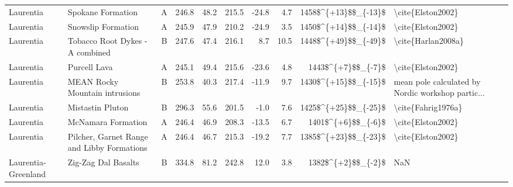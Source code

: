 \begin{longtable}{p{1 in}p{1 in}rrrrrrr}
                     Laurentia &                                  Spokane Formation &      A &     246.8 &      48.2 & 215.5 & -24.8 &       4.7 &   1458\$\textasciicircum \{+13\}\$\$\_\{-13\}\$ &                                  \textbackslash cite\{Elston2002\} \\
                     Laurentia &                                 Snowslip Formation &      A &     245.9 &      47.9 & 210.2 & -24.9 &       3.5 &   1450\$\textasciicircum \{+14\}\$\$\_\{-14\}\$ &                                  \textbackslash cite\{Elston2002\} \\
                     Laurentia &                    Tobacco Root Dykes - A combined &      B &     247.6 &      47.4 & 216.1 &   8.7 &      10.5 &   1448\$\textasciicircum \{+49\}\$\$\_\{-49\}\$ &                                 \textbackslash cite\{Harlan2008a\} \\
                     Laurentia &                                       Purcell Lava &      A &     245.1 &      49.4 & 215.6 & -23.6 &       4.8 &     1443\$\textasciicircum \{+7\}\$\$\_\{-7\}\$ &                                  \textbackslash cite\{Elston2002\} \\
                     Laurentia &                     MEAN Rocky Mountain intrusions &      B &     253.8 &      40.3 & 217.4 & -11.9 &       9.7 &   1430\$\textasciicircum \{+15\}\$\$\_\{-15\}\$ &  mean pole calculated by Nordic workshop partic... \\
                     Laurentia &                                   Mistastin Pluton &      B &     296.3 &      55.6 & 201.5 &  -1.0 &       7.6 &   1425\$\textasciicircum \{+25\}\$\$\_\{-25\}\$ &                                 \textbackslash cite\{Fahrig1976a\} \\
                     Laurentia &                                 McNamara Formation &      A &     246.4 &      46.9 & 208.3 & -13.5 &       6.7 &     1401\$\textasciicircum \{+6\}\$\$\_\{-6\}\$ &                                  \textbackslash cite\{Elston2002\} \\
                     Laurentia &         Pilcher, Garnet Range and Libby Formations &      A &     246.4 &      46.7 & 215.3 & -19.2 &       7.7 &   1385\$\textasciicircum \{+23\}\$\$\_\{-23\}\$ &                                  \textbackslash cite\{Elston2002\} \\
           Laurentia-Greenland &                                Zig-Zag Dal Basalts &      B &     334.8 &      81.2 & 242.8 &  12.0 &       3.8 &     1382\$\textasciicircum \{+2\}\$\$\_\{-2\}\$ &                                                NaN \\

\end{longtable}
